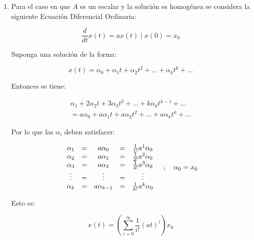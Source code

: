     \begin{enumerate}

    \item Para el caso en que $A$ es un escalar y la solución es homogénea se considera la siguiente Ecuación Diferencial Ordinaria:

        \begin{equation}
            \frac{d}{dt} x(t) = a x(t) \mid x(0) = x_0
        \end{equation}

        Suponga una solución de la forma:

        \begin{equation}
            x(t) = \alpha_0 + \alpha_1 t + \alpha_2 t^2 + \dots + \alpha_k t^k + \dots
        \end{equation}

        Entonces se tiene:

        \begin{multline}
            \alpha_1 + 2 \alpha_2 t + 3 \alpha_3 t^2 + \dots + k \alpha_k t^{k-1} + \dots \\ = a \alpha_0 + a \alpha_1 t + a \alpha_2 t^2 + \dots + a \alpha_k t^k + \dots \nonumber
        \end{multline}

        Por lo que las $\alpha_i$ deben satisfacer:

        \begin{equation}
            \begin{array}{c c c c c}
            \alpha_1 & = & a \alpha_0     & = & \frac{1}{1!} a^1 \alpha_0 \\
            \alpha_2 & = & a \alpha_1     & = & \frac{1}{2!} a^2 \alpha_0 \\
            \alpha_3 & = & a \alpha_2     & = & \frac{1}{3!} a^3 \alpha_0 \\
            \vdots   & = & \vdots         & = & \vdots                    \\
            \alpha_k & = & a \alpha_{k-1} & = & \frac{1}{k!} a^k \alpha_0 \\
            \end{array} \quad ; \quad \alpha_0 = x_0
        \end{equation}

        Esto es:

        \begin{equation}
            x(t) = \left( \sum\limits_{i = 0}^{\infty} \frac{1}{i!} (a t)^i \right) x_0 \nonumber
        \end{equation}


\end{enumerate}
